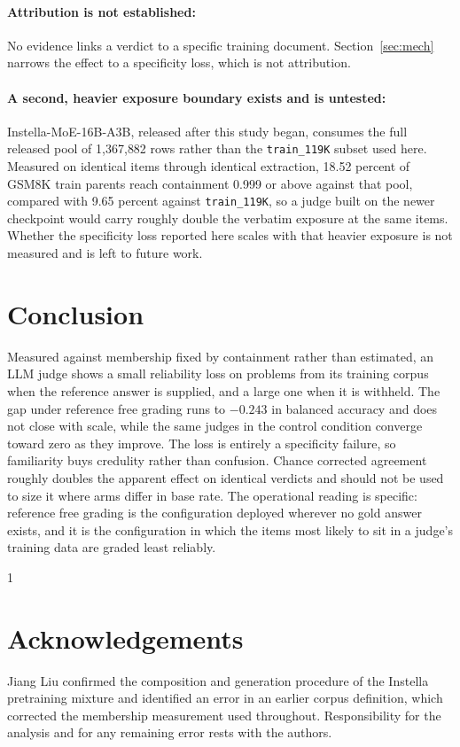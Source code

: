 \documentclass{article}
\newcommand{\cameraready}{0}
\begin{document}
\paragraph{Attribution is not established:} No evidence links a verdict to a specific
training document. Section~\ref{sec:mech} narrows the effect to a specificity loss, which is
not attribution.

\paragraph{A second, heavier exposure boundary exists and is untested:} Instella-MoE-16B-A3B,
released after this study began, consumes the full released pool of 1{,}367{,}882 rows rather
than the \texttt{train\_119K} subset used here. Measured on identical items through identical
extraction, 18.52 percent of GSM8K train parents reach containment 0.999 or above against
that pool, compared with 9.65 percent against \texttt{train\_119K}, so a judge built on the
newer checkpoint would carry roughly double the verbatim exposure at the same items. Whether
the specificity loss reported here scales with that heavier exposure is not measured and is
left to future work.

\section{Conclusion}

Measured against membership fixed by containment rather than estimated, an LLM judge shows a
small reliability loss on problems from its training corpus when the reference answer is
supplied, and a large one when it is withheld. The gap under reference free grading runs to
$-0.243$ in balanced accuracy and does not close with scale, while the same judges in the
control condition converge toward zero as they improve. The loss is entirely a specificity
failure, so familiarity buys credulity rather than confusion. Chance corrected agreement
roughly doubles the apparent effect on identical verdicts and should not be used to size it
where arms differ in base rate. The operational reading is specific: reference free grading
is the configuration deployed wherever no gold answer exists, and it is the configuration in
which the items most likely to sit in a judge's training data are graded least reliably.

\if\cameraready1
\section*{Acknowledgements}
Jiang Liu confirmed the composition and generation procedure of the Instella
pretraining mixture and identified an error in an earlier corpus definition,
which corrected the membership measurement used throughout. Responsibility for
the analysis and for any remaining error rests with the authors.
\fi
\end{document}
